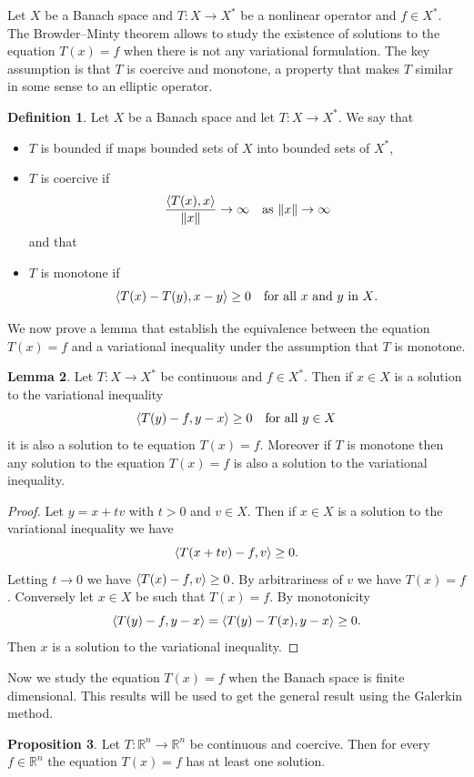 \documentclass[a4paper,10pt,oneside]{amsbook}
\numberwithin{section}{chapter}
\numberwithin{equation}{chapter}
\theoremstyle{definition}
\newtheorem{prop}{Proposition}[chapter]
\newtheorem{defi}[prop]{Definition}
\newtheorem{lemma}[prop]{Lemma}
\DeclarePairedDelimiter{\norm}{\lVert}{\rVert}
\DeclarePairedDelimiter{\dual}{\langle}{\rangle}
\begin{document}
Let $X$ be a Banach space and $T\colon X\to X^*$ be a nonlinear operator and $f\in X^*$. The Browder--Minty theorem allows to study the existence of solutions to the equation $T(x)=f$ when there is not any variational formulation. The key assumption is that $T$ is coercive and monotone, a property that makes $T$ similar in some sense to an elliptic operator.
\begin{defi}
Let $X$ be a Banach space and let $T\colon X\to X^*$. We say that
\begin{itemize}
\item[(i)] $T$ is bounded if maps bounded sets of $X$ into bounded sets of $X^*$,
\item[(ii)] $T$ is coercive if
\[
\frac{\dual{T(x),x}}{\norm{x}}\to\infty\quad\text{as $\norm{x}\to\infty$}
\]
and that
\item[(iii)] $T$ is monotone if
\[
\dual{T(x)-T(y),x-y}\ge 0\quad\text{for all $x$ and $y$ in $X$}.
\]
\end{itemize}
\end{defi}
We now prove a lemma that establish the equivalence between the equation $T(x)=f$ and a variational inequality under the assumption that $T$ is monotone.
\begin{lemma}
\label{lemma:equality-inequality}
Let $T\colon X\to X^*$ be continuous and $f\in X^*$. Then if $x\in X$ is a solution to the variational inequality
\[
\dual{T(y)-f,y-x}\ge0\quad\text{for all $y\in X$}
\]
it is also a solution to te equation $T(x)=f$. Moreover if $T$ is monotone then any solution to the equation $T(x)=f$ is also a solution to the variational inequality.
\end{lemma}
\begin{proof}
Let $y=x+tv$ with $t>0$ and $v\in X$. Then if $x\in X$ is a solution to the variational inequality we have
\[
\dual{T(x+tv)-f,v}\ge 0.
\]
Letting $t\to0$ we have $\dual{T(x)-f,v}\ge0$. By arbitrariness of $v$ we have $T(x)=f$. Conversely let $x\in X$ be such that $T(x)=f$. By monotonicity
\[
\dual{T(y)-f,y-x}=\dual{T(y)-T(x),y-x}\ge 0.
\]
Then $x$ is a solution to the variational inequality.
\end{proof}
Now we study the equation $T(x)=f$ when the Banach space is finite dimensional. This results will be used to get the general result using the Galerkin method.
\begin{prop}
\label{prop:elliptic-finite-dimensional}
Let $T\colon\mathbb{R}^n\to\mathbb{R}^n$ be continuous and coercive. Then for every $f\in\mathbb{R}^n$ the equation $T(x)=f$ has at least one solution.
\end{prop}
\end{document}
